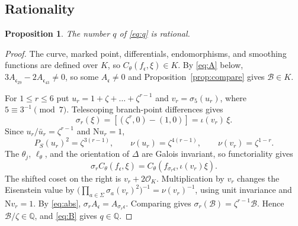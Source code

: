 \documentclass[11pt]{amsart}
\newtheorem{proposition}[theorem]{Proposition}
\theoremstyle{remark}
\theoremstyle{definition}
\newcommand{\Q}{\mathbb{Q}}
\newcommand{\OK}{\mathcal{O}_K}
\newcommand{\Nm}{\mathrm{N}}
\newcommand{\Bn}{\mathcal{B}}
\begin{document}
\subsection{Rationality}
\begin{proposition}\label{prop:rational}
The number $q$ of \eqref{eq:q} is rational.
\end{proposition}

\begin{proof}
The curve, marked point, differentials, endomorphisms, and smoothing functions are defined over $K$, so $C_\theta(f_{\mathfrak c},\xi)\in K$. By \eqref{eq:A} below, $3A_{\mathfrak c_{29}}-2A_{\mathfrak c_{43}}\ne0$, so some $A_{\mathfrak c}\ne0$ and Proposition~\ref{prop:compare} gives $\Bn\in K$.

For $1\le r\le 6$ put $u_r=1+\zeta+\dots+\zeta^{r-1}$ and $v_r=\sigma_5(u_r)$, where $5\equiv3^{-1}\pmod7$. Telescoping branch-point differences gives
\[
\sigma_r(\xi)=[(\zeta^r,0)-(1,0)]=\iota(v_r)\,\xi.
\]
Since $u_r/\bar u_r=\zeta^{r-1}$ and $\Nm u_r=1$,
\[
P_S(u_r)^2=\zeta^{3(r-1)},\qquad \nu(u_r)=\zeta^{4(r-1)},\qquad \nu(v_r)=\zeta^{1-r}.
\]
The $\theta_j$, $\ell_\theta$, and the orientation of $\Delta$ are Galois invariant, so functoriality gives
\[
\sigma_r C_\theta(f_{\mathfrak c},\xi)=C_\theta(f_{\sigma_r\mathfrak c},\iota(v_r)\xi).
\]
The shifted coset on the right is $v_r+2\OK$. Multiplication by $v_r$ changes the Eisenstein value by $\bigl(\prod_{a\in\Sigma}\sigma_a(v_r)^2\bigr)^{-1}=\nu(v_r)^{-1}$, using unit invariance and $\Nm v_r=1$. By \eqref{eq:abs}, $\sigma_rA_{\mathfrak c}=A_{\sigma_r\mathfrak c}$. Comparing gives $\sigma_r(\Bn)=\zeta^{r-1}\Bn$. Hence $\Bn/\zeta\in\Q$, and \eqref{eq:B} gives $q\in\Q$.
\end{proof}
\end{document}
